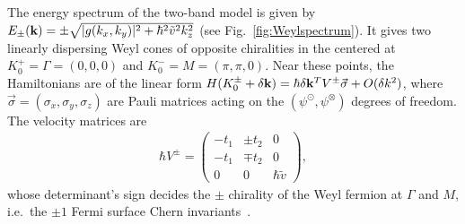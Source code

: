 The energy spectrum of the two-band model is given by $E_\pm({\bf k})=\pm\sqrt{|g(k_x,k_y)|^2+\hbar^2\tilde{v}^2k_z^2}$ (see Fig.~\ref{fig:Weylspectrum}).
It gives two linearly dispersing Weyl cones of opposite chiralities in the \BZ centered at $K^+_0=\Gamma=(0,0,0)$ and $K^-_0=M=(\pi,\pi,0)$. Near these points, the Hamiltonians are of the linear form $H(K_0^\pm+\delta{\bf k})=\hbar\delta{\bf k}^TV^\pm\vec\sigma+O(\delta k^2)$, where $\vec\sigma=(\sigma_x,\sigma_y,\sigma_z)$ are Pauli matrices acting on the $(\psi^\odot,\psi^\otimes)$ degrees of freedom. The velocity matrices are \begin{align}\hbar V^\pm=\left(\begin{array}{ccc}-t_1&\pm t_2&0\\-t_1&\mp t_2&0\\0&0&\hbar\tilde{v}\end{array}\right),\end{align} whose determinant's %
sign decides the $\pm$ chirality of the Weyl fermion at $\Gamma$ and $M$, i.e.~the $\pm1$ Fermi surface Chern invariants~\cite{WanVishwanathSavrasovPRB11,Ashvin_Weyl_review,RMP}. %
